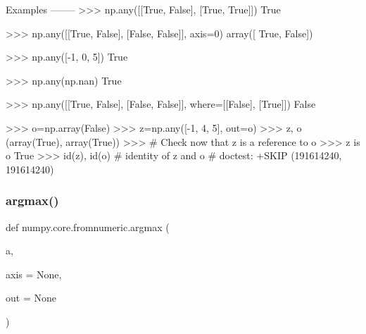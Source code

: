 \begin{DoxyVerb}
Examples
--------
>>> np.any([[True, False], [True, True]])
True

>>> np.any([[True, False], [False, False]], axis=0)
array([ True, False])

>>> np.any([-1, 0, 5])
True

>>> np.any(np.nan)
True

>>> np.any([[True, False], [False, False]], where=[[False], [True]])
False

>>> o=np.array(False)
>>> z=np.any([-1, 4, 5], out=o)
>>> z, o
(array(True), array(True))
>>> # Check now that z is a reference to o
>>> z is o
True
>>> id(z), id(o) # identity of z and o              # doctest: +SKIP
(191614240, 191614240)\end{DoxyVerb}
 \mbox{\label{namespacenumpy_1_1core_1_1fromnumeric_a083371d5f8442e43fd4a713850936323}} 
\subsubsection{\texorpdfstring{argmax()}{argmax()}}
{\footnotesize\ttfamily def numpy.\+core.\+fromnumeric.\+argmax (\begin{DoxyParamCaption}\item[{}]{a,  }\item[{}]{axis = {\ttfamily None},  }\item[{}]{out = {\ttfamily None} }\end{DoxyParamCaption})}

